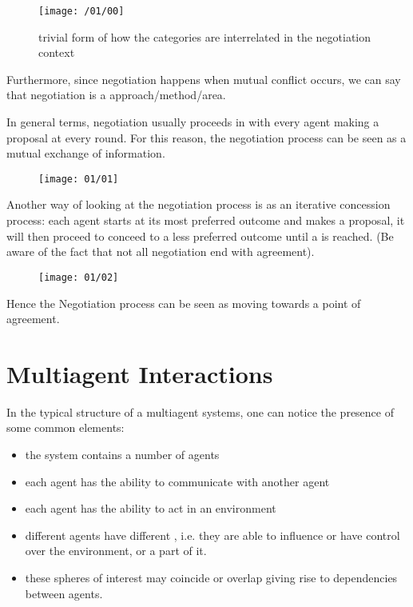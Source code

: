\begin{figure}[!h]
\centering
\texttt{[image: /01/00]}
\caption{trivial form of how the categories are interrelated in the negotiation context}
\end{figure}

Furthermore, since negotiation happens when mutual conflict occurs, we can say that negotiation is a  approach/method/area.

In general terms, negotiation usually proceeds in   with every agent making a proposal at every round.
For this reason, the negotiation process can be seen as a mutual exchange of information.

\begin{figure}[!h]
\centering
\texttt{[image: 01/01]}
\end{figure}

Another way of looking at the negotiation process is as an iterative concession process: each agent starts at its most preferred outcome and makes a proposal, it will then proceed to conceed to a less preferred outcome until a  is reached. (Be aware of the fact that not all negotiation end with agreement).

\begin{figure}[!h]
\centering
\texttt{[image: 01/02]}
\end{figure}

Hence the Negotiation process can be seen as moving towards a point of agreement.

\section{Multiagent Interactions}
	In the typical structure of a multiagent systems, one can notice the presence of some common elements:
	\begin{itemize}
	\item the system contains a number of agents
	\item each agent has the ability to communicate with another agent
	\item each agent has the ability to act in an environment
	\item different agents have different , i.e. they are able to influence or have control over the environment, or a part of it.
	\item these spheres of interest may coincide or overlap giving rise to dependencies between agents.
	\end{itemize}	
	
